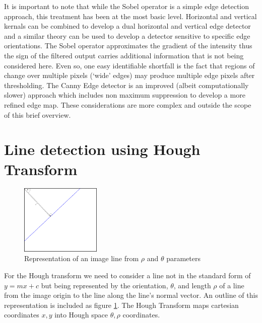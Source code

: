 \documentclass{article}
\begin{document}
	It is important to note that while the Sobel operator is a simple edge detection approach, this treatment has been at the most basic level. Horizontal and vertical kernals can be combined to develop a dual horizontal and vertical edge detector and a similar theory can be used to develop a detector sensitive to specific edge orientations. The Sobel operator approximates the gradient of the intensity thus the sign of the filtered output carries additional information that is not being considered here. Even so, one easy identifiable shortfall is the fact that regions of change over multiple pixels (`wide' edges) may produce multiple edge pixels after thresholding. The Canny Edge detector is an improved (albeit computationally slower) approach which includes non maximum suppression to develop a more refined edge map. These considerations are more complex and outside the scope of this brief overview.	
	
	
	\section{Line detection using Hough Transform}
		
	\begin{figure}
		\begin{center}
			\includegraphics[width=0.34\textwidth]{HoughLineSpace}
		\end{center}
		\caption{Representation of an image line from $\rho$ and $\theta$ parameters}
		\label{HoughLineSpace}
	\end{figure}

	For the Hough transform we need to consider a line not in the standard form of $y = mx + c$ but being represented by the orientation, $\theta$, and length $\rho$ of a line from the image origin to the line along the line's normal vector. An outline of this representation is included as figure \ref{HoughLineSpace}. The Hough Transform maps cartesian coordinates $x, y$ into Hough space $\theta , \rho$ coordinates. 
%	
\end{document}
